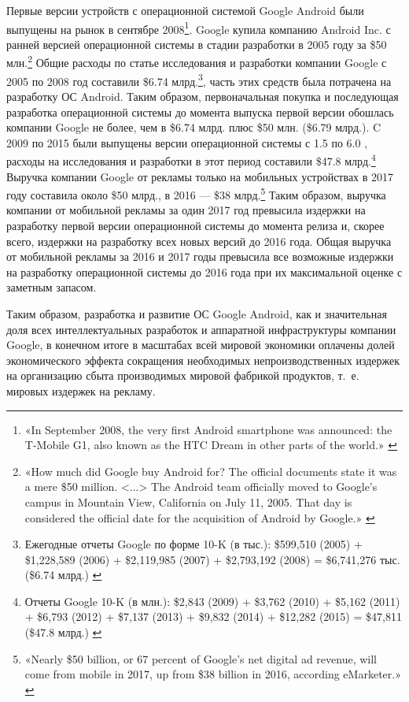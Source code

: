 \documentclass{article}
\begin{document}
Первые версии устройств с операционной системой Google Android были выпущены на рынок в сентябре 2008\footnote{«In September 2008, the very first Android smartphone was announced: the T-Mobile G1, also known as the HTC Dream in other parts of the world.» \cite{androidVersionHistory2024}}. Google купила компанию Android Inc. с ранней версией операционной системы в стадии разработки в 2005 году за \$50 млн.\footnote{«How much did Google buy Android for? The official documents state it was a mere \$50 million. <...> The Android team officially moved to Google’s campus in Mountain View, California on July 11, 2005. That day is considered the official date for the acquisition of Android by Google.» \cite{androidAquiredByGoogleHistory2022}} Общие расходы по статье исследования и разработки компании Google с 2005 по 2008 год составили \$6.74 млрд.\footnote{Ежегодные отчеты Google по форме 10-K (в тыс.): \$599,510 (2005) + \$1,228,589 (2006) + \$2,119,985 (2007) + \$2,793,192 (2008) = \$6,741,276 тыс. (\$6.74 млрд.) \cite{google10K2009}}, часть этих средств была потрачена на разработку ОС Android. Таким образом, первоначальная покупка и последующая разработка операционной системы до момента выпуска первой версии обошлась компании Google не более, чем в \$6.74 млрд. плюс \$50 млн. (\$6.79 млрд.). C 2009 по 2015 были выпущены версии операционной системы с 1.5 по 6.0 \cite{androidVersionHistory2024}, расходы на исследования и разработки в этот период составили \$47.8 млрд.\footnote{Отчеты Google 10-K (в млн.): \$2,843 (2009) + \$3,762 (2010) + \$5,162 (2011) + \$6,793 (2012) + \$7,137 (2013) + \$9,832 (2014) + \$12,282 (2015) = \$47,811 (\$47.8 млрд.) \cite{google10K2009, google10K2012, google10K2015}} Выручка компании Google от рекламы только на мобильных устройствах в 2017 году составила около \$50 млрд., в 2016 — \$38 млрд.\footnote{«Nearly \$50 billion, or 67 percent of Google’s net digital ad revenue, will come from mobile in 2017, up from \$38 billion in 2016, according eMarketer.» \cite{googleRevenue2017}} Таким образом, выручка компании от мобильной рекламы за один 2017 год превысила издержки на разработку первой версии операционной системы до момента релиза и, скорее всего, издержки на разработку всех новых версий до 2016 года. Общая выручка от мобильной рекламы за 2016 и 2017 годы превысила все возможные издержки на разработку операционной системы до 2016 года при их максимальной оценке с заметным запасом.

Таким образом, разработка и развитие ОС Google Android, как и значительная доля всех интеллектуальных разработок и аппаратной инфраструктуры компании Google, в конечном итоге в масштабах всей мировой экономики оплачены долей экономического эффекта сокращения необходимых непроизводственных издержек на организацию сбыта производимых мировой фабрикой продуктов, т.~е. мировых издержек на рекламу.
\end{document}
